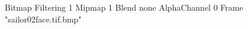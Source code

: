 {Bitmap
	{Filtering 1}
	{Mipmap 1}
	{Blend none}
	{AlphaChannel 0}
	{Frame "sailor02face.tif.bmp"}
}
